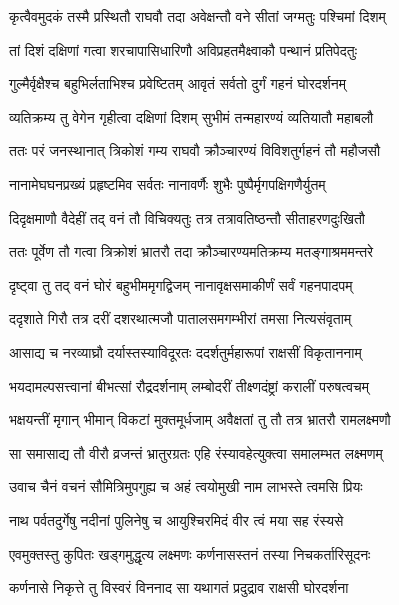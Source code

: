 
\twolineshloka
{कृत्वैवमुदकं तस्मै प्रस्थितौ राघवौ तदा}
{अवेक्षन्तौ वने सीतां जग्मतुः पश्चिमां दिशम्} %

\twolineshloka
{तां दिशं दक्षिणां गत्वा शरचापासिधारिणौ}
{अविप्रहतमैक्ष्वाकौ पन्थानं प्रतिपेदतुः} %

\twolineshloka
{गुल्मैर्वृक्षैश्च बहुभिर्लताभिश्च प्रवेष्टितम्}
{आवृतं सर्वतो दुर्गं गहनं घोरदर्शनम्} %

\twolineshloka
{व्यतिक्रम्य तु वेगेन गृहीत्वा दक्षिणां दिशम्}
{सुभीमं तन्महारण्यं व्यतियातौ महाबलौ} %

\twolineshloka
{ततः परं जनस्थानात् त्रिकोशं गम्य राघवौ}
{क्रौञ्चारण्यं विविशतुर्गहनं तौ महौजसौ} %

\twolineshloka
{नानामेघघनप्रख्यं प्रहृष्टमिव सर्वतः}
{नानावर्णैः शुभैः पुष्पैर्मृगपक्षिगणैर्युतम्} %

\twolineshloka
{दिदृक्षमाणौ वैदेहीं तद् वनं तौ विचिक्यतुः}
{तत्र तत्रावतिष्ठन्तौ सीताहरणदुःखितौ} %

\twolineshloka
{ततः पूर्वेण तौ गत्वा त्रिक्रोशं भ्रातरौ तदा}
{क्रौञ्चारण्यमतिक्रम्य मतङ्गाश्रममन्तरे} %

\twolineshloka
{दृष्ट्वा तु तद् वनं घोरं बहुभीममृगद्विजम्}
{नानावृक्षसमाकीर्णं सर्वं गहनपादपम्} %

\twolineshloka
{ददृशाते गिरौ तत्र दरीं दशरथात्मजौ}
{पातालसमगम्भीरां तमसा नित्यसंवृताम्} %

\twolineshloka
{आसाद्य च नरव्याघ्रौ दर्यास्तस्याविदूरतः}
{ददर्शतुर्महारूपां राक्षसीं विकृताननाम्} %

\twolineshloka
{भयदामल्पसत्त्वानां बीभत्सां रौद्रदर्शनाम्}
{लम्बोदरीं तीक्ष्णदंष्ट्रां करालीं परुषत्वचम्} %

\twolineshloka
{भक्षयन्तीं मृगान् भीमान् विकटां मुक्तमूर्धजाम्}
{अवैक्षतां तु तौ तत्र भ्रातरौ रामलक्ष्मणौ} %

\twolineshloka
{सा समासाद्य तौ वीरौ व्रजन्तं भ्रातुरग्रतः}
{एहि रंस्यावहेत्युक्त्वा समालम्भत लक्ष्मणम्} %

\twolineshloka
{उवाच चैनं वचनं सौमित्रिमुपगुह्य च}
{अहं त्वयोमुखी नाम लाभस्ते त्वमसि प्रियः} %

\twolineshloka
{नाथ पर्वतदुर्गेषु नदीनां पुलिनेषु च}
{आयुश्चिरमिदं वीर त्वं मया सह रंस्यसे} %

\twolineshloka
{एवमुक्तस्तु कुपितः खड्गमुद्धृत्य लक्ष्मणः}
{कर्णनासस्तनं तस्या निचकर्तारिसूदनः} %

\twolineshloka
{कर्णनासे निकृत्ते तु विस्वरं विननाद सा}
{यथागतं प्रदुद्राव राक्षसी घोरदर्शना} %

